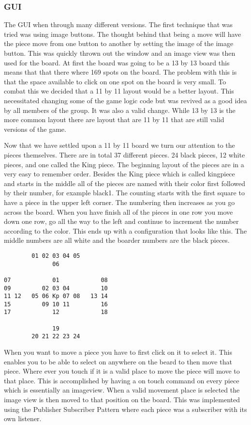 \documentclass{article}
\begin{document}
\subsubsection{GUI}
	The GUI when through many different versions. The first technique that was tried was using image buttons. The thought behind that being a move will have the piece move from one button to another by setting the image of the image button. This was quickly thrown out the window and an image view was then used for the board. At first the board was going to be a 13 by 13 board this means that that there where 169 spots on the board. The problem with this is that the space available to click on one spot on the board is very small. To combat this we decided that a 11 by 11 layout would be a better layout. This necessitated changing some of the game logic code but was revived as a good idea by all members of the group. It was also a valid change. While 13 by 13 is the more common layout there are layout that are 11 by 11 that are still valid versions of the game. \par
	Now that we have settled upon a 11 by 11 board we turn our attention to the pieces themselves. There are in total 37 different pieces. 24 black pieces, 12 white pieces, and one called the King piece.  The beginning layout of the pieces are in a very easy to remember order. Besides the King piece which is called kingpiece and starts in the middle all of the pieces are named with their color first followed by their number, for example black1. The counting starts with the first square to have a piece in the upper left corner. The numbering then increases as you go across the board. When you have finish all of the pieces in one row you move down one row, go all the way to the left and continue to increment the number according to the color. This ends up with a configuration that looks like this. The middle numbers are all white and the boarder numbers are the black pieces.
\begin{verbatim}
        01 02 03 04 05
              06
      
07            01            08
09         02 03 04         10
11 12   05 06 Kp 07 08   13 14
15         09 10 11         16
17            12            18

              19
        20 21 22 23 24
\end{verbatim}\par
	When you want to move a piece you have to first click on it to select it. This enables you to be able to select on anywhere on the beard to then move that piece. Where ever you touch if it is a valid place to move the piece will move to that place. This is accomplished by having a on touch command on every piece which is essentially an imageview. When a valid movement place is selected the image view is then moved to that position on the board. This was implemented using the Publisher Subscriber Pattern where each piece was a subscriber with its own listener. 
\end{document}
